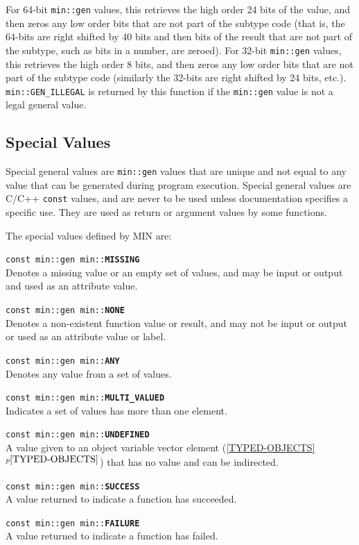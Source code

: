 \documentclass[12pt]{article}
\makeatletter
\newcommand{\ttindex}[1]{\index{#1@{\tt #1}}}
\newcommand{\minindex}[1]{\ttindex{min::#1}\ttindex{#1}}
\newcommand{\itemref}[1]{\ref{#1}$^{p\pageref{#1}}$}
\newenvironment{indpar}[1][0.3in]%
	{\begin{list}{}%
		     {\setlength{\itemsep}{0in}%
		      \setlength{\topsep}{0in}%
		      \setlength{\parsep}{1ex}%
		      \setlength{\labelwidth}{#1}%
		      \setlength{\leftmargin}{#1}%
		      \addtolength{\leftmargin}{\labelsep}}%
	 \item}%
	{\end{list}}
\newcommand{\LABEL}[1]{\label{#1}}
\newcommand{\MINKEY}[1]{{\tt \bf #1}\minindex{#1}}
\makeatother
\begin{document}
For 64-bit \verb|min::gen| values, this retrieves the high order
24 bits of the value, and then zeros any low order bits that are not
part of the subtype code (that is, the 64-bits are right shifted by
40 bits and then bits of the result that are not part of the
subtype, such as bits in a number, are zeroed).
For 32-bit \verb|min::gen| values, this retrieves
the high order 8 bits, and then zeros any low order bits that are not
part of the subtype code (similarly the 32-bits are right shifted by
24 bits, etc.).
\verb|min::GEN_ILLEGAL| is returned by this function if the \verb|min::gen|
value is not a legal general value.

\subsection{Special Values}
\label{SPECIAL-VALUES}

Special general values are \verb|min::gen| values that are unique
and not equal to any value that can be generated during
program execution.  Special general values are C/C++ {\tt const}
values, and are never to be used unless documentation specifies
a specific use.  They are used as return or argument
values by some functions.

The special values defined by MIN are:

\begin{indpar}
\begin{list}{}{}
\item[{\tt const min::gen min::}\MINKEY{MISSING}]~%
	\LABEL{MIN::MISSING}\\
Denotes a missing value or an empty set of values, and may be input
or output and used as an attribute value.
\item[{\tt const min::gen min::}\MINKEY{NONE}]~%
	\LABEL{MIN::NONE}\\
Denotes a non-existent function value or result, and may not be
input or output or used as an attribute value or label.
\item[{\tt const min::gen min::}\MINKEY{ANY}]~%
	\LABEL{MIN::ANY}\\
Denotes any value from a set of values.
\item[{\tt const min::gen min::}\MINKEY{MULTI\_VALUED}]~%
	\LABEL{MIN::MULTI_VALUED}\\
Indicates a set of values has more than one element.
\item[{\tt const min::gen min::}\MINKEY{UNDEFINED}]~%
	\LABEL{MIN::UNDEFINED}\\
A value given to an object variable vector element
(\itemref{TYPED-OBJECTS}) that has no value and can be indirected.
\item[{\tt const min::gen min::}\MINKEY{SUCCESS}]~%
	\LABEL{MIN::SUCCESS}\\
A value returned to indicate a function has succeeded.
\item[{\tt const min::gen min::}\MINKEY{FAILURE}]~%
	\LABEL{MIN::FAILURE}\\
A value returned to indicate a function has failed.
\end{list}
\end{indpar}
\end{document}
